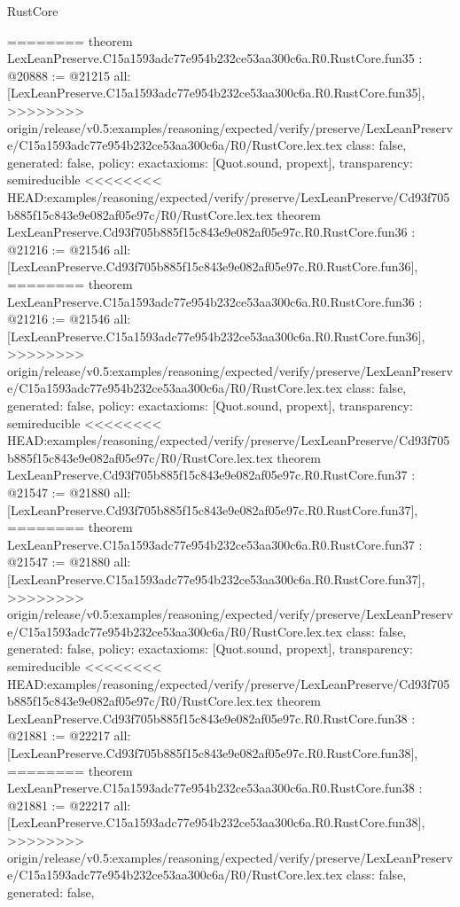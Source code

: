 \begin{lexlean}{RustCore}
\begin{coremodule}
{\begin{coremodule}
{{{{{{{{{{{{{{{{{{{{{{{{{{{{{{{{{{{{{{========
theorem LexLeanPreserve.C15a1593adc77e954b232ce53aa300c6a.R0.RustCore.fun35 : @20888 := @21215 {
  all: [LexLeanPreserve.C15a1593adc77e954b232ce53aa300c6a.R0.RustCore.fun35],
>>>>>>>> origin/release/v0.5:examples/reasoning/expected/verify/preserve/LexLeanPreserve/C15a1593adc77e954b232ce53aa300c6a/R0/RustCore.lex.tex
  class: false,
  generated: false,
  policy: exact{axioms: [Quot.sound, propext]},
  transparency: semireducible
}
<<<<<<<< HEAD:examples/reasoning/expected/verify/preserve/LexLeanPreserve/Cd93f705b885f15c843e9e082af05e97c/R0/RustCore.lex.tex
theorem LexLeanPreserve.Cd93f705b885f15c843e9e082af05e97c.R0.RustCore.fun36 : @21216 := @21546 {
  all: [LexLeanPreserve.Cd93f705b885f15c843e9e082af05e97c.R0.RustCore.fun36],
========
theorem LexLeanPreserve.C15a1593adc77e954b232ce53aa300c6a.R0.RustCore.fun36 : @21216 := @21546 {
  all: [LexLeanPreserve.C15a1593adc77e954b232ce53aa300c6a.R0.RustCore.fun36],
>>>>>>>> origin/release/v0.5:examples/reasoning/expected/verify/preserve/LexLeanPreserve/C15a1593adc77e954b232ce53aa300c6a/R0/RustCore.lex.tex
  class: false,
  generated: false,
  policy: exact{axioms: [Quot.sound, propext]},
  transparency: semireducible
}
<<<<<<<< HEAD:examples/reasoning/expected/verify/preserve/LexLeanPreserve/Cd93f705b885f15c843e9e082af05e97c/R0/RustCore.lex.tex
theorem LexLeanPreserve.Cd93f705b885f15c843e9e082af05e97c.R0.RustCore.fun37 : @21547 := @21880 {
  all: [LexLeanPreserve.Cd93f705b885f15c843e9e082af05e97c.R0.RustCore.fun37],
========
theorem LexLeanPreserve.C15a1593adc77e954b232ce53aa300c6a.R0.RustCore.fun37 : @21547 := @21880 {
  all: [LexLeanPreserve.C15a1593adc77e954b232ce53aa300c6a.R0.RustCore.fun37],
>>>>>>>> origin/release/v0.5:examples/reasoning/expected/verify/preserve/LexLeanPreserve/C15a1593adc77e954b232ce53aa300c6a/R0/RustCore.lex.tex
  class: false,
  generated: false,
  policy: exact{axioms: [Quot.sound, propext]},
  transparency: semireducible
}
<<<<<<<< HEAD:examples/reasoning/expected/verify/preserve/LexLeanPreserve/Cd93f705b885f15c843e9e082af05e97c/R0/RustCore.lex.tex
theorem LexLeanPreserve.Cd93f705b885f15c843e9e082af05e97c.R0.RustCore.fun38 : @21881 := @22217 {
  all: [LexLeanPreserve.Cd93f705b885f15c843e9e082af05e97c.R0.RustCore.fun38],
========
theorem LexLeanPreserve.C15a1593adc77e954b232ce53aa300c6a.R0.RustCore.fun38 : @21881 := @22217 {
  all: [LexLeanPreserve.C15a1593adc77e954b232ce53aa300c6a.R0.RustCore.fun38],
>>>>>>>> origin/release/v0.5:examples/reasoning/expected/verify/preserve/LexLeanPreserve/C15a1593adc77e954b232ce53aa300c6a/R0/RustCore.lex.tex
  class: false,
  generated: false,
}}}}}}}}}}}}}}}}}}}}}}}}}}}}}}}}}}}}}}}}}}
\end{coremodule}}
\end{coremodule}
\end{lexlean}

